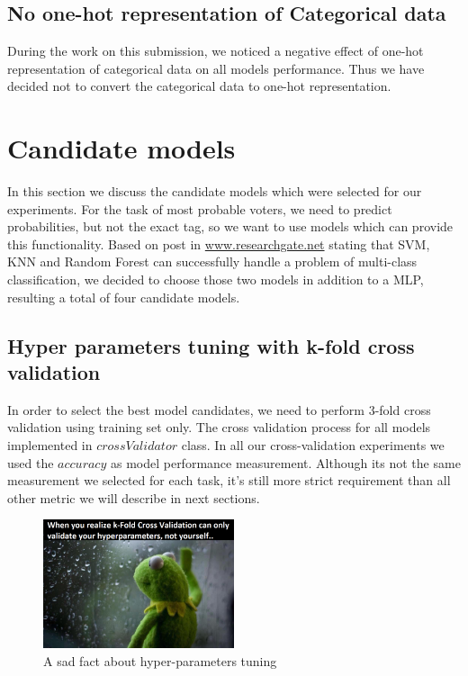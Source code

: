 \documentclass[12pt]{article}
\begin{document}
\subsection{No one-hot representation of Categorical data}
During the work on this submission, we noticed a negative effect of one-hot representation of categorical data on all models performance. Thus we have decided not to convert the categorical data to one-hot representation.


\newpage
\section{Candidate models}
In this section we discuss the candidate models which were selected for our experiments. For the task of most probable voters, we need to predict probabilities, but not the exact tag, so we want to use models which can provide this functionality. Based on post in \href{https://www.researchgate.net/post/What_are_the_best_supervised_classifiers_to_classify_the_problem_of_multiclass_classification}{www.researchgate.net} stating that SVM, KNN and Random Forest can successfully handle a problem of multi-class classification, we decided to choose those two models in addition to a MLP, resulting a total of four candidate models.

\subsection{Hyper parameters tuning with k-fold cross validation}
In order to select the best model candidates, we need to perform 3-fold cross validation using training set only. The cross validation process for all models implemented in $crossValidator$ class. In all our cross-validation experiments we used the $accuracy$ as model performance measurement. Although its not the same measurement we selected for each task, it's still more strict requirement than all other metric we will describe in next sections.

\begin{figure}[h]
\centering
\includegraphics[width=0.5\textwidth]{report_pics/frog}
\caption{A sad fact about hyper-parameters tuning}
\end{figure}
\end{document}
